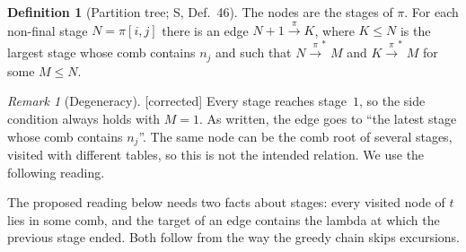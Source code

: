 \documentclass[11pt]{article}
\newcommand{\iv}[2]{\pi[#1,#2]}
\newcommand{\ra}[1]{\xrightarrow{#1}}
\newcommand{\Fixed}{\textsf{[corrected]}}
\theoremstyle{plain}
\theoremstyle{definition}
\newtheorem{definition}[theorem]{Definition}
\theoremstyle{remark}
\newtheorem{remark}[theorem]{Remark}
\begin{document}
\begin{definition}[Partition tree; S, Def.~46]\label{def:ptree}
The nodes are the stages of $\pi$.  For each non-final stage $N=\iv ij$
there is an edge $N+1\ra\pi K$, where $K\le N$ is the largest stage
whose comb contains $n_j$ and such that $N\ra\pi^*M$ and $K\ra\pi^*M$
for some $M\le N$.
\end{definition}

\begin{remark}[Degeneracy]\label{rem:ptree}
\Fixed{} Every stage reaches stage~$1$, so the side condition always
holds with $M=1$.  As written, the edge goes to ``the latest stage whose
comb contains $n_j$''.  The same node can be the comb root of several
stages, visited with different tables, so this is not the intended
relation.  We use the following reading.
\end{remark}

The proposed reading below needs two facts about stages: every visited
node of $t$ lies in some comb, and the target of an edge contains the
lambda at which the previous stage ended.  Both follow from the way the
greedy chain skips excursions.
\end{document}
